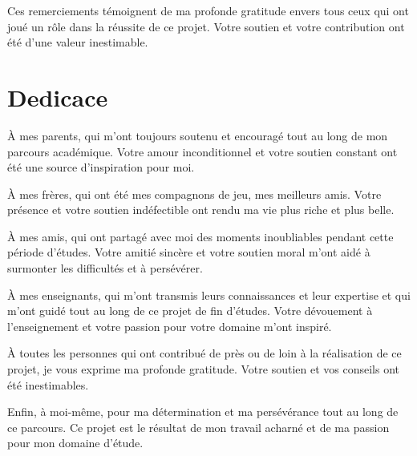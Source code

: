 \documentclass[a4paper,12pt]{report}
\begin{document}
\vspace{0.8cm}

Ces remerciements témoignent de ma profonde gratitude envers tous ceux qui ont joué un rôle dans la réussite de ce projet. Votre soutien et votre contribution ont été d’une valeur inestimable.


\chapter*{Dedicace}
\vspace{1cm}

À mes parents, qui m’ont toujours soutenu et encouragé tout au long de mon parcours académique.  
Votre amour inconditionnel et votre soutien constant ont été une source d’inspiration pour moi.

\vspace{0.8cm}

À mes frères, qui ont été mes compagnons de jeu, mes meilleurs amis. Votre présence et votre soutien indéfectible ont rendu ma vie plus riche et plus belle.

\vspace{0.8cm}

À mes amis, qui ont partagé avec moi des moments inoubliables pendant cette période d’études. Votre amitié sincère et votre soutien moral m’ont aidé à surmonter les difficultés et à persévérer.

\vspace{0.8cm}

À mes enseignants, qui m’ont transmis leurs connaissances et leur expertise et qui m’ont guidé tout au long de ce projet de fin d’études. Votre dévouement à l’enseignement et votre passion pour votre domaine m’ont inspiré.

\vspace{0.8cm}

À toutes les personnes qui ont contribué de près ou de loin à la réalisation de ce projet, je vous exprime ma profonde gratitude. Votre soutien et vos conseils ont été inestimables.

\vspace{0.8cm}

Enfin, à moi-même, pour ma détermination et ma persévérance tout au long de ce parcours. Ce projet est le résultat de mon travail acharné et de ma passion pour mon domaine d’étude.
\end{document}
